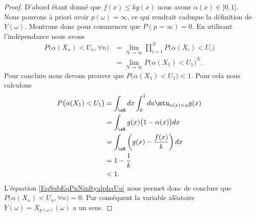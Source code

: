 \begin{proof}
	D'abord étant donné que \( f(x)\leq kg(x)\) nous avons \( \alpha(x)\in\mathopen[ 0 , 1 \mathclose]\). Nous pouvons à priori avoir \( p(\omega)=\infty\), ce qui rendrait caduque la définition de \( Y(\omega)\). Montrons donc pour commencer que \( P(p=\infty)=0\). En utilisant l'indépendance nous avons
	\begin{subequations}        \label{EqSubEqPnNinftyalphaUu}
		\begin{align}
			P\big( \alpha(X_n)<U_n,\forall n\big) & =\lim_{N\to \infty} \prod_{i=1}^NP\big( \alpha(X_i)< U_i \big) \\
			                                      & =\lim_{N\to \infty} P\big( \alpha(X_1)<U_1 \big)^N.
		\end{align}
	\end{subequations}
	Pour conclure nous devons prouver que \( P\big( \alpha(X_1)<U_1 \big)< 1\). Pour cela nous calculons
	\begin{subequations}
		\begin{align}
			P\big( \alpha(X_1)<U_1 \big) & =\int_{\eR}dx\int_0^1du\mtu_{\alpha(x)<u}g(x)       \\
			                             & =\int_{\eR}g(x)\big( 1-\alpha(x) \big)dx            \\
			                             & =\int_{\eR}\left( g(x)-\frac{ f(x) }{ k } \right)dx \\
			                             & =1-\frac{1}{ k }                                    \\
			                             & <1.
		\end{align}
	\end{subequations}
	L'équation \eqref{EqSubEqPnNinftyalphaUu} nous permet donc de conclure que \( P\big( \alpha(X_n)<U_n,\forall n\big)=0\). Par conséquent la variable aléatoire \( Y(\omega)=X_{p(\omega)}(\omega)\) a un sens.


\end{proof}
